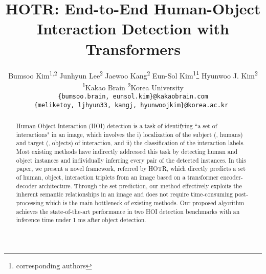 \documentclass[final]{cvpr}
\begin{document}
\title{HOTR: End-to-End Human-Object Interaction Detection with Transformers}
\newcommand*\samethanks[1][\value{footnote}]{\footnotemark[#1]}
\author{
Bumsoo Kim\textsuperscript{\rm 1,2}\hspace{0.4cm}
Junhyun Lee\textsuperscript{\rm 2}\hspace{0.4cm}
Jaewoo Kang\textsuperscript{\rm 2}\hspace{0.4cm}
Eun-Sol Kim\textsuperscript{\rm 1}\thanks{corresponding authors}\hspace{0.4cm}
Hyunwoo J. Kim\textsuperscript{\rm 2}\samethanks\vspace{0.2cm}
\\\textsuperscript{\rm 1}Kakao Brain \hspace{0.4cm} \textsuperscript{\rm 2}Korea University
\\\tt\small \{bumsoo.brain, eunsol.kim\}@kakaobrain.com
\\\tt\small \{meliketoy, ljhyun33, kangj, hyunwoojkim\}@korea.ac.kr
}

\maketitle

\begin{abstract}
   Human-Object Interaction (HOI) detection is a task of identifying ``a set of interactions" in an image, which involves the i) localization of the subject (\ie, humans) and target (\ie, objects) of interaction, and ii) the classification of the interaction labels.
   Most existing methods have indirectly addressed this task by detecting human and object instances and individually inferring every pair of the detected instances.
   In this paper, we present a novel framework, referred by HOTR, which directly predicts a set of human, object, interaction triplets from an image based on a transformer encoder-decoder architecture.
   Through the set prediction, our method effectively exploits the inherent semantic relationships in an image and does not require time-consuming post-processing which is the main bottleneck of existing methods.
   Our proposed algorithm achieves the state-of-the-art performance in two HOI detection benchmarks with an inference time under 1 ms after object detection.
\end{abstract} 
\end{document}
